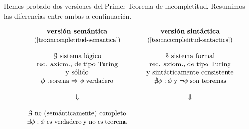 Hemos probado dos versiones del Primer Teorema de Incompletitud. Resumimos las diferencias entre ambas a continuación.
\vspace{8pt}
\begin{figure}[H]
$$
\begin{array}{ccc}
    {
        \begin{matrix}
            \text{\textbf{versión semántica}} \\
            \text{\small{(\cref{teo:incompletitud-semantica})}}\\
            \small{\;}
        \end{matrix}
    }
    & \;\;\; &
    {
        \begin{matrix}
            \text{\textbf{versión sintáctica}} \\
            \text{\small{(\cref{teo:incompletitud-sintactica})}}\\
            \small{\;}
        \end{matrix}
    }
    \\
    {
        \begin{matrix}
            \mathcal{G}\text{ sistema lógico}\\
            \text{rec. axiom., de tipo Turing}\\
            \text{y sólido} \\
            \small{\phi \text{ teorema} \Rightarrow \phi\text{ verdadero}}\\
            \tiny{\;}
        \end{matrix}
    }
    &  & 
    {
        \begin{matrix}
            \mathcal{S}\text{ sistema formal}\\
            \text{rec. axiom., de tipo Turing}\\
            \text{y sintácticamente consistente} \\
            \small{\nexists \phi : \phi\text{ y }\neg\phi \text{ son teoremas}}\\
            \tiny{\;}
        \end{matrix}
    } \\
    \Huge{\Downarrow} & & \Huge{\Downarrow} \\
    {
        \begin{matrix}
            \tiny{\;}\\
            \mathcal{G}\text{ no (semánticamente) completo}\\
            \small{\exists\phi:\phi\text{ es verdadero y no es teorema}}
        \end{matrix}
}
\end{array}$$
\end{figure}
